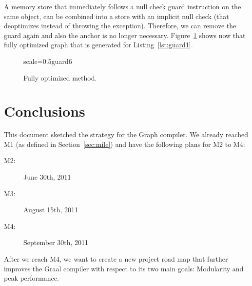 \documentclass[twocolumn]{svjour3}
\begin{document}
A memory store that immediately follows a null check guard instruction on the same object, can be combined into a store with an implicit null check (that deoptimizes instead of throwing the exception).
Therefore, we can remove the guard again and also the anchor is no longer necessary.
Figure~\ref{fig:guard6} shows now that fully optimized graph that is generated for Listing~\ref{lst:guard1}.

\begin{figure}[ht]
  \centering
\begin{digraphenv}{scale=0.5}{guard6}
\end{digraphenv}
  \caption{Fully optimized method.}
  \label{fig:guard6}
\end{figure}


\section{Conclusions}
\label{sec:conclusions}
This document sketched the strategy for the Graph compiler.
We already reached M1 (as defined in Section~\ref{sec:mile}) and have the following plans for M2 to M4:
\begin{description}
\item[M2:] June 30th, 2011
\item[M3:] August 15th, 2011
\item[M4:] September 30th, 2011
\end{description}
After we reach M4, we want to create a new project road map that further improves the Graal compiler with respect to its two main goals: Modularity and peak performance.
\end{document}
